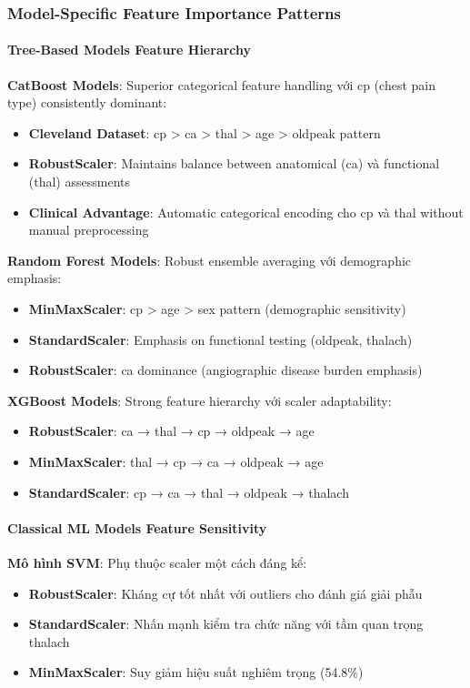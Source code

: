 \subsubsection{Model-Specific Feature Importance Patterns}

\paragraph{Tree-Based Models Feature Hierarchy}

\textbf{CatBoost Models}: Superior categorical feature handling với cp (chest pain type) consistently dominant:
\begin{itemize}
    \item \textbf{Cleveland Dataset}: cp > ca > thal > age > oldpeak pattern
    \item \textbf{RobustScaler}: Maintains balance between anatomical (ca) và functional (thal) assessments  
    \item \textbf{Clinical Advantage}: Automatic categorical encoding cho cp và thal without manual preprocessing
\end{itemize}

\textbf{Random Forest Models}: Robust ensemble averaging với demographic emphasis:
\begin{itemize}
    \item \textbf{MinMaxScaler}: cp > age > sex pattern (demographic sensitivity)
    \item \textbf{StandardScaler}: Emphasis on functional testing (oldpeak, thalach)
    \item \textbf{RobustScaler}: ca dominance (angiographic disease burden emphasis)
\end{itemize}

\textbf{XGBoost Models}: Strong feature hierarchy với scaler adaptability:
\begin{itemize}
    \item \textbf{RobustScaler}: ca → thal → cp → oldpeak → age
    \item \textbf{MinMaxScaler}: thal → cp → ca → oldpeak → age
    \item \textbf{StandardScaler}: cp → ca → thal → oldpeak → thalach
\end{itemize}

\paragraph{Classical ML Models Feature Sensitivity}

\textbf{Mô hình SVM}: Phụ thuộc scaler một cách đáng kể:
\begin{itemize}
    \item \textbf{RobustScaler}: Kháng cự tốt nhất với outliers cho đánh giá giải phẫu
    \item \textbf{StandardScaler}: Nhấn mạnh kiểm tra chức năng với tầm quan trọng thalach
    \item \textbf{MinMaxScaler}: Suy giảm hiệu suất nghiêm trọng (54.8\%)
\end{itemize}

